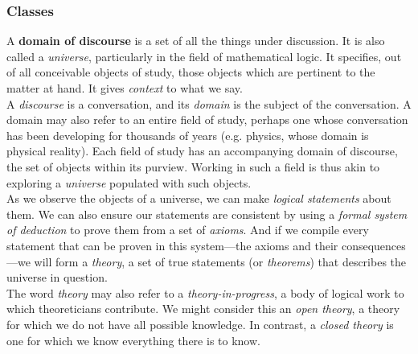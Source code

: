 
\subsubsection{Classes}


A \textbf{domain of discourse} is a set of all the things under discussion. It is also called a \textit{universe}, particularly in the field of mathematical logic. It specifies, out of all conceivable objects of study, those objects which are pertinent to the matter at hand. It gives \textit{context} to what we say. \\

A \textit{discourse} is a conversation, and its \textit{domain} is the subject of the conversation. A domain may also refer to an entire field of study, perhaps one whose conversation has been developing for thousands of years (e.g. physics, whose domain is physical reality). Each field of study has an accompanying domain of discourse, the set of objects within its purview. Working in such a field is thus akin to exploring a \textit{universe} populated with such objects. \\

As we observe the objects of a universe, we can make \textit{logical statements} about them. We can also ensure our statements are consistent by using a \textit{formal system of deduction} to prove them from a set of \textit{axioms}. And if we compile every statement that can be proven in this system---the axioms and their consequences---we will form a \textit{theory}, a set of true statements (or \textit{theorems}) that describes the universe in question. \\

The word \textit{theory} may also refer to a \textit{theory-in-progress}, a body of logical work to which theoreticians contribute. We might consider this an \textit{open theory}, a theory for which we do not have all possible knowledge. In contrast, a \textit{closed theory} is one for which we know everything there is to know. \\


